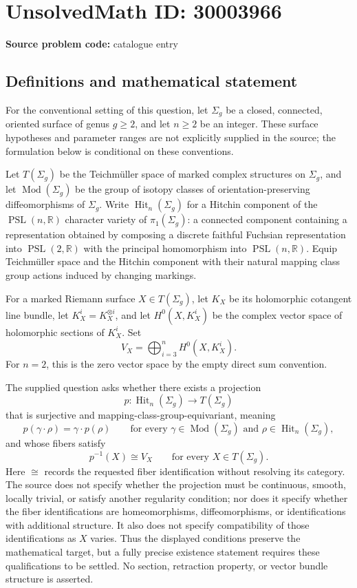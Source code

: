 \documentclass[11pt]{article}
\newcommand{\R}{\mathbb{R}}
\begin{document}
\section*{UnsolvedMath ID: 30003966}
\textbf{Source problem code:} catalogue entry
\subsection{Definitions and mathematical statement}
For the conventional setting of this question, let \(\Sigma_g\) be a closed, connected, oriented surface of genus \(g\geq 2\), and let \(n\geq 2\) be an integer. These surface hypotheses and parameter ranges are not explicitly supplied in the source; the formulation below is conditional on these conventions.

Let \(T(\Sigma_g)\) be the Teichm\"uller space of marked complex structures on \(\Sigma_g\), and let \(\operatorname{Mod}(\Sigma_g)\) be the group of isotopy classes of orientation-preserving diffeomorphisms of \(\Sigma_g\). Write \(\operatorname{Hit}_n(\Sigma_g)\) for a Hitchin component of the \(\operatorname{PSL}(n,\R)\) character variety of \(\pi_1(\Sigma_g)\): a connected component containing a representation obtained by composing a discrete faithful Fuchsian representation into \(\operatorname{PSL}(2,\R)\) with the principal homomorphism into \(\operatorname{PSL}(n,\R)\). Equip Teichm\"uller space and the Hitchin component with their natural mapping class group actions induced by changing markings.

For a marked Riemann surface \(X\in T(\Sigma_g)\), let \(K_X\) be its holomorphic cotangent line bundle, let \(K_X^i=K_X^{\otimes i}\), and let \(H^0(X,K_X^i)\) be the complex vector space of holomorphic sections of \(K_X^i\). Set
\[
V_X=\bigoplus_{i=3}^{n}H^0(X,K_X^i).
\]
For \(n=2\), this is the zero vector space by the empty direct sum convention.

The supplied question asks whether there exists a projection
\[
p:\operatorname{Hit}_n(\Sigma_g)\longrightarrow T(\Sigma_g)
\]
that is surjective and mapping-class-group-equivariant, meaning
\[
p(\gamma\cdot\rho)=\gamma\cdot p(\rho)
\qquad
\text{for every }\gamma\in\operatorname{Mod}(\Sigma_g)
\text{ and }\rho\in\operatorname{Hit}_n(\Sigma_g),
\]
and whose fibers satisfy
\[
p^{-1}(X)\cong V_X
\qquad\text{for every }X\in T(\Sigma_g).
\]
Here \(\cong\) records the requested fiber identification without resolving its category. The source does not specify whether the projection must be continuous, smooth, locally trivial, or satisfy another regularity condition; nor does it specify whether the fiber identifications are homeomorphisms, diffeomorphisms, or identifications with additional structure. It also does not specify compatibility of those identifications as \(X\) varies. Thus the displayed conditions preserve the mathematical target, but a fully precise existence statement requires these qualifications to be settled. No section, retraction property, or vector bundle structure is asserted.
\end{document}
